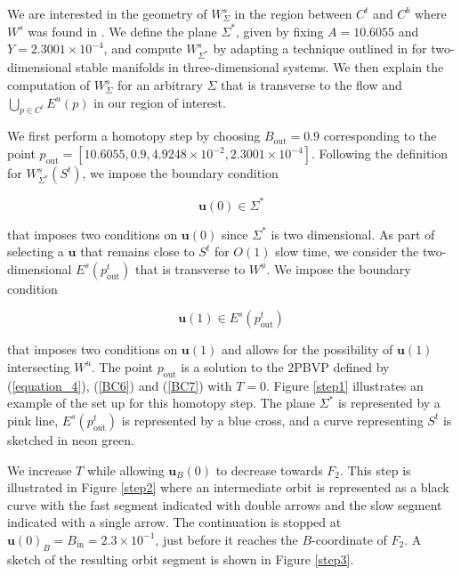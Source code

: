 \documentclass{ws-ijbc}
\begin{document}
We are interested in the geometry of $W^{s}_{\Sigma}$ in the region between $C^t$ and $C^b$ where $W^s$ was found in \cite{QSSA}.  We define the plane $\Sigma^*$, given by fixing $A=10.6055$ and $Y=2.3001 \times 10^{-4}$, and compute $W^{s}_{\Sigma^*}$ by adapting a technique outlined in \cite{Saeed_Paper} for two-dimensional stable manifolds in three-dimensional systems.  We then explain the computation of $W^{s}_{\Sigma}$ for an arbitrary $\Sigma$ that is transverse to the flow and $\bigcup_{p \in C^t} E^u(p)$ in our region of interest.
    
We first perform a homotopy step by choosing $B_{\mathrm{out}} = 0.9$ corresponding to the point $p_{\text{out}}=[10.6055, 0.9, 4.9248 \times 10^{-2}, 2.3001 \times 10^{-4}]$.  Following the definition for $W^s_{\Sigma^*}(S^t)$, we impose the boundary condition
    
\begin{equation}
\mathbf{u}(0) \in \Sigma^*
\label{BC6}
\end{equation}
    
 \noindent
that imposes two conditions on $\mathbf{u}(0)$ since $\Sigma^*$ is two dimensional.  As part of selecting a $\mathbf{u}$ that remains close to $S^t$ for $O(1)$ slow time, we consider the two-dimensional $E^s(p^t_{\text{out}})$ that is transverse to $W^u$.  We impose the boundary condition
    
\begin{equation}
\mathbf{u}(1) \in E^s(p^t_{\text{out}})
\label{BC7}
\end{equation}
    
\noindent
that imposes two conditions on $\mathbf{u}(1)$ and allows for the possibility of $\mathbf{u}(1)$ intersecting $W^u$.  The point $p_{\text{out}}$ is a solution to the 2PBVP defined by (\ref{equation_4}), (\ref{BC6}) and (\ref{BC7}) with $T=0$.  Figure \ref{step1} illustrates an example of the set up for this homotopy step.  The plane $\Sigma^*$ is represented by a pink line, $E^s(p^t_{\mathrm{out}})$ is represented by a blue cross, and a curve representing $S^t$ is sketched in neon green.
    
We increase $T$ while allowing $\mathbf{u}_{B}(0)$ to decrease towards $F_2$.  This step is illustrated in Figure \ref{step2} where an intermediate orbit is represented as a black curve with the fast segment indicated with double arrows and the slow segment indicated with a single arrow.  The continuation is stopped at $\mathbf{u}(0)_B = B_{\text{in}}=2.3 \times 10^{-1}$, just before it reaches the $B$-coordinate of $F_2$.  A sketch of the resulting orbit segment is shown in Figure \ref{step3}.
    
\end{document}
